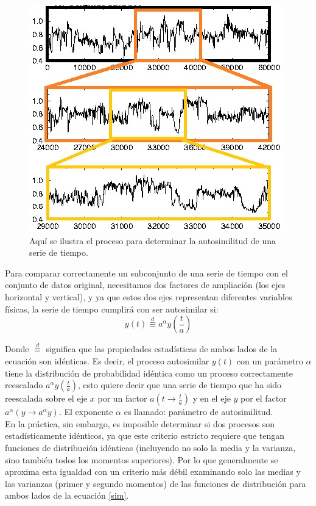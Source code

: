 \documentclass[letterpaper,titlepage,12pt,draft]{report}
\begin{document}
\begin{figure}[H]
\begin{center}
\includegraphics[scale=0.7]{ventanas.jpg}
\caption{Aqu\'i se ilustra el proceso para determinar la autosimilitud de una serie de tiempo.}
\label{fig:ventanas}
\end{center}
\end{figure}

Para comparar correctamente un subconjunto de una serie de tiempo con el conjunto de datos original, necesitamos dos factores de ampliaci\'on (los ejes horizontal y vertical), y ya que estos dos ejes representan diferentes variables f\'isicas, la serie de tiempo cumplir\'a con ser autosimilar si:
\begin{equation}
y(t)\stackrel{d}{\equiv} a^{\alpha} y\left(\frac{t}{a}\right)
\label{sim}
\end{equation}

Donde $\stackrel{d}{\equiv}$ significa que las propiedades estad\'isticas de ambos lados de la ecuaci\'on son id\'enticas. Es decir, el proceso autosimilar $y(t)$ con un par\'ametro $\alpha$ tiene la distribuci\'on de probabilidad id\'entica como un proceso correctamente reescalado $a^{\alpha} y\left(\frac{t}{a}\right)$, esto quiere decir que una serie de tiempo que ha sido reescalada sobre el eje $x$ por un factor $a\left(t\rightarrow \frac{t}{a}\right)$ y en el eje $y$ por el factor $a^{\alpha}(y\rightarrow a^{\alpha}y)$. El exponente $\alpha$ es llamado: par\'ametro de autosimilitud.\\

En la pr\'actica, sin embargo, es imposible determinar si dos procesos son estad\'isticamente id\'enticos, ya que este criterio estricto requiere que tengan funciones de distribuci\'on id\'enticas (incluyendo no solo la media y la varianza, sino tambi\'en todos los momentos superiores). Por lo que generalmente se aproxima esta igualdad con un criterio m\'as d\'ebil examinando solo las medias y las varianzas (primer y segundo momentos) de las funciones de distribuci\'on para ambos lados de la ecuaci\'on \ref{sim}.\\
\end{document}
